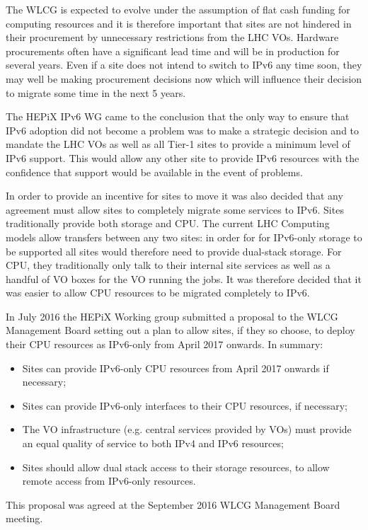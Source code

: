 \documentclass[a4paper]{jpconf}
\begin{document}
The WLCG is expected to evolve under the assumption of flat cash
funding for computing resources and it is therefore important that
sites are not hindered in their procurement by unnecessary
restrictions from the LHC VOs. Hardware procurements often have a
significant lead time and will be in production for several
years.  Even if a site does not intend to switch to IPv6 any time
soon, they may well be making procurement decisions now which will
influence their decision to migrate some time in the next 5 years.

The HEPiX IPv6 WG came to the conclusion that the only way to ensure that
IPv6 adoption did not become a problem was to make a strategic
decision and to mandate the LHC VOs as well as all Tier-1 sites to provide
a minimum level of IPv6 support.  This would allow any other site to
provide IPv6 resources with the confidence that support would be available
in the event of problems.

In order to provide an incentive for sites to move it was also decided
that any agreement must allow sites to completely migrate some
services to IPv6. Sites traditionally provide both storage and CPU.
The current LHC Computing models allow transfers between
any two sites: in order for for IPv6-only storage to be supported
all sites would therefore need to provide dual-stack storage.
For CPU, they traditionally only
talk to their internal site services as well as a handful of VO boxes
for the VO running the jobs.  It was therefore decided that it was
easier to allow CPU resources to be migrated completely to IPv6.

In July 2016 the HEPiX Working group submitted a proposal to the WLCG
Management Board setting out a plan to allow sites, if they so choose,
to deploy their CPU resources as IPv6-only from April 2017 onwards.  In summary: 

\begin{itemize}
\item Sites can provide IPv6-only CPU resources from April 2017 onwards if necessary;
\item Sites can provide IPv6-only interfaces to their CPU resources, if necessary;
\item The VO infrastructure (e.g. central services provided by VOs) must provide an equal quality of service to both IPv4 and IPv6 resources;
\item Sites should allow dual stack access to their storage resources, to allow remote access from IPv6-only resources.
\end{itemize}
This proposal was agreed at the September 2016 WLCG Management Board meeting.
\end{document}
